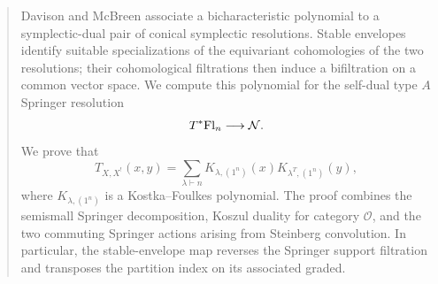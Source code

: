 \begin{abstract}
Davison and McBreen associate a bicharacteristic polynomial to a
symplectic-dual pair of conical symplectic resolutions. Stable envelopes
identify suitable specializations of the equivariant cohomologies of
the two resolutions; their cohomological filtrations then induce a
bifiltration on a common vector space. We compute this polynomial for
the self-dual type $A$ Springer resolution
\[
  T^*\Fln\longrightarrow\mathcal N.
\]
We prove that
\[
  T_{X,X^!}(x,y)
  =\sum_{\lambda\vdash n}
    K_{\lambda,(1^n)}(x)K_{\lambda^T,(1^n)}(y),
\]
where $K_{\lambda,(1^n)}$ is a Kostka--Foulkes polynomial. The proof
combines the semismall Springer decomposition, Koszul duality for
category $\mathcal O$, and the two commuting Springer actions arising
from Steinberg convolution. In particular, the stable-envelope map
reverses the Springer support filtration and transposes the partition
index on its associated graded.
\end{abstract}
